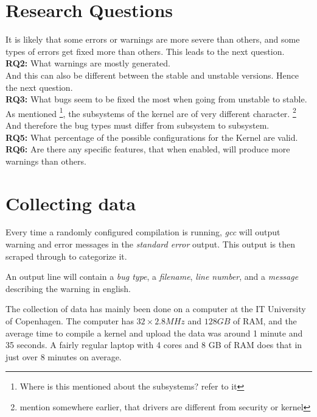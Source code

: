 \documentclass[a4paper,11pt]{report}
\begin{document}
\section{Research Questions}


It is likely that some errors or warnings are more severe than others, and some 
types of errors get fixed more than others. This leads to the next question.
\\


\textbf{RQ2:} What warnings are mostly generated.  
\\


And this can also be different between the stable and unstable versions. Hence 
the next question. 
\\


\textbf{RQ3:} What bugs seem to be fixed the most when going from unstable to 
stable. 
\\


As mentioned \footnote{Where is this mentioned about the subsystems? refer to 
it}, the subsystems of the kernel are of very different character. 
\footnote{mention somewhere earlier, that drivers are different from security 
or kernel} And therefore the bug types must differ from subsystem to subsystem. 
\\




\textbf{RQ5:} What percentage of the possible configurations for the Kernel are 
valid. 
\\


\textbf{RQ6:} Are there any specific features, that when enabled, will produce 
more warnings than others. 
\\




\section{Collecting data}

Every time a randomly configured compilation is running, \emph{gcc} will 
output warning and error messages in the \emph{standard error} output. This 
output is then scraped through to categorize it.

An output line will contain a \emph{bug type}, a \emph{filename}, \emph{line 
number}, and a \emph{message} describing the warning in english.


The collection of data has mainly been done on a computer at the IT University 
of Copenhagen. The computer has $32\times2.8 MHz$ and $128 GB$ of RAM, and the 
average time to compile a kernel and upload the data was around 1 minute and 35 
seconds. A fairly regular laptop with 4 cores and 8 GB of RAM does that in just 
over 8 minutes on average. 
\\
\end{document}
